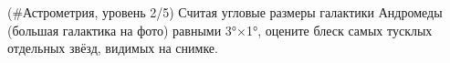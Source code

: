 \begin{task}{4}
    (\#Астрометрия, уровень 2/5)
    Считая угловые размеры галактики Андромеды (большая галактика на фото) равными 3°×1°, оцените блеск самых тусклых отдельных звёзд, видимых на снимке.
\end{task}

\begin{solution}
    
\end{solution}